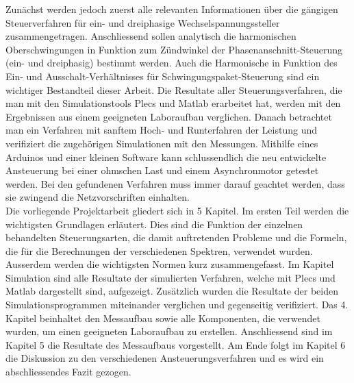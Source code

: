 Zunächst werden jedoch zuerst alle relevanten Informationen über die gängigen Steuerverfahren für ein- und dreiphasige Wechselspannungssteller zusammengetragen. Anschliessend sollen analytisch die harmonischen Oberschwingungen in Funktion zum Zündwinkel der Phasenanschnitt-Steuerung (ein- und dreiphasig) bestimmt werden. Auch die Harmonische in Funktion des Ein- und Ausschalt-Verhältnisses für Schwingungspaket-Steuerung sind ein wichtiger Bestandteil dieser Arbeit. Die Resultate aller Steuerungsverfahren, die man mit den Simulationstools Plecs und Matlab erarbeitet hat, werden mit den Ergebnissen aus einem geeigneten Laboraufbau verglichen. Danach betrachtet man ein Verfahren mit sanftem Hoch- und Runterfahren der Leistung und verifiziert die zugehörigen Simulationen mit den Messungen. Mithilfe eines Arduinos und einer kleinen Software kann schlussendlich die neu entwickelte Ansteuerung bei einer ohmschen Last und einem Asynchronmotor getestet werden. Bei den gefundenen Verfahren muss immer darauf geachtet werden, dass sie zwingend die Netzvorschriften einhalten.\\
Die vorliegende Projektarbeit gliedert sich in 5 Kapitel. Im ersten Teil werden die wichtigsten Grundlagen erläutert. Dies sind die Funktion der einzelnen behandelten Steuerungsarten, die damit auftretenden Probleme und die Formeln, die für die Berechnungen der verschiedenen Spektren, verwendet wurden. Ausserdem werden die wichtigsten Normen kurz zusammengefasst. Im Kapitel Simulation sind alle Resultate der simulierten Verfahren, welche mit Plecs und Matlab dargestellt sind, aufgezeigt. Zusätzlich wurden die Resultate der beiden Simulationsprogrammen miteinander verglichen und gegenseitig verifiziert. Das 4. Kapitel beinhaltet den Messaufbau sowie alle Komponenten, die verwendet wurden, um einen geeigneten Laboraufbau zu erstellen. Anschliessend sind im Kapitel 5 die Resultate des Messaufbaus vorgestellt. Am Ende folgt im Kapitel 6 die Diskussion zu den verschiedenen Ansteuerungsverfahren und es wird ein abschliessendes Fazit gezogen.





















